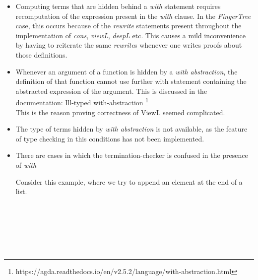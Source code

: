 \documentclass[12pt,twoside,notitlepage]{report}
\begin{document}
\begin{itemize}
\item Computing terms that are hidden behind a \textit{with} statement requires recomputation of the expression present in the \textit{with} clause. In the \textit{FingerTree} case, this occurs because of the \textit{rewrite} statements present throughout the implementation of \textit{cons}, \textit{viewL}, \textit{deepL} etc. This causes a mild inconvenience by having to reiterate the same \textit{rewrite}s whenever one writes proofs about those definitions.

\item Whenever an argument of a function is hidden by a \textit{with abstraction}, the definition of that function cannot use further with statement containing the abstracted expression of the argument. This is discussed in the documentation: Ill-typed with-abstraction \footnote{https://agda.readthedocs.io/en/v2.5.2/language/with-abstraction.html} \\
This is the reason proving correctness of ViewL seemed complicated.

\item The type of terms hidden by \textit{with abstraction} is not available, as the feature of type checking in this conditions has not been implemented.

\item There are cases in which the termination-checker is confused in the presence of \textit{with}

Consider this example, where we try to append an element at the end of a list.

\begin{code}
\\
\> \AgdaSymbol{:}  \AgdaSymbol{\{}\AgdaSymbol{\}}        \<%
\\
\>    \<%
\\
\>   \AgdaSymbol{|} \AgdaInductiveConstructor{[]} \AgdaSymbol{=}   \AgdaInductiveConstructor{[]}\<%
\\
\>   \AgdaSymbol{|}    \AgdaSymbol{=}   \AgdaSymbol{(}  \AgdaSymbol{)}\<%
\\
\end{code} 

\end{itemize}
\end{document}
